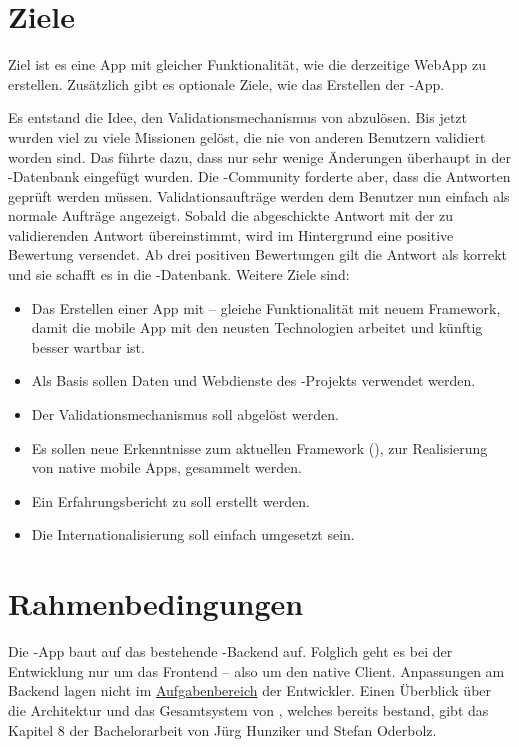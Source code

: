 \section{Ziele}
\label{tb-einfuehrung-ziele}
Ziel ist es eine  App mit gleicher Funktionalität, wie die derzeitige \gls{WebApp} zu erstellen.
Zusätzlich gibt es optionale Ziele, wie das Erstellen der -App.

Es entstand die Idee, den Validationsmechanismus von \kort{} abzulösen.
Bis jetzt wurden viel zu viele Missionen gelöst, die nie von anderen Benutzern validiert worden sind.
Das führte dazu, dass nur sehr wenige Änderungen überhaupt in der -Datenbank eingefügt wurden.
Die -Community forderte aber, dass die Antworten geprüft werden müssen.
Validationsaufträge werden dem Benutzer nun einfach als normale Aufträge angezeigt.
Sobald die abgeschickte Antwort mit der zu validierenden Antwort übereinstimmt, wird im Hintergrund eine positive Bewertung versendet.
Ab drei positiven Bewertungen gilt die Antwort als korrekt und sie schafft es in die -Datenbank.
Weitere Ziele sind:

\begin{itemize}
	\item Das Erstellen einer  App mit  -- gleiche Funktionalität mit neuem Framework, damit die mobile App mit den neusten Technologien arbeitet und künftig besser wartbar ist.
	\item Als Basis sollen Daten und Webdienste des -Projekts verwendet werden.
	\item Der Validationsmechanismus soll abgelöst werden.
	\item Es sollen neue Erkenntnisse zum aktuellen Framework (), zur Realisierung von native mobile Apps, gesammelt werden.
	\item Ein Erfahrungsbericht zu  soll erstellt werden.
	\item Die Internationalisierung soll einfach umgesetzt sein.
\end{itemize}

\section{Rahmenbedingungen}
Die -App baut auf das bestehende \kort{}-Backend auf.  
Folglich geht es bei der Entwicklung nur um das Frontend -- also um den native Client.
Anpassungen am Backend lagen nicht im \hyperref[pd-anforderungsspezifikation]{Aufgabenbereich} der Entwickler.
Einen Überblick über die Architektur und das Gesamtsystem von \kort{}, welches bereits bestand, gibt das Kapitel 8 der Bachelorarbeit von Jürg Hunziker und Stefan Oderbolz.\cite{ba-kort-2012}

